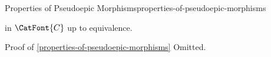 \begin{proposition}{Properties of Pseudoepic Morphisms}{properties-of-pseudoepic-morphisms}
\begin{enumerate}
\begin{enumerate}
\begin{webcompile}
                    \end{webcompile}
                    in $\CatFont{C}$ up to equivalence.
            \end{enumerate}
    \end{enumerate}
\end{proposition}
\begin{Proof}{Proof of \cref{properties-of-pseudoepic-morphisms}}%
    Omitted.
\end{Proof}
\begin{appendices}

\end{appendices}

